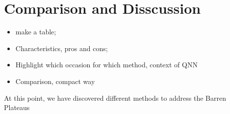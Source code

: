 \section{Comparison and Disscussion}
\begin{itemize}
    \item make a table;
    \item Characteristics, pros and cons;
    \item Highlight which occasion for which method, context of QNN
    \item Comparison, compact way
\end{itemize}

At this point, we have discovered different methods to address the Barren Plateaus